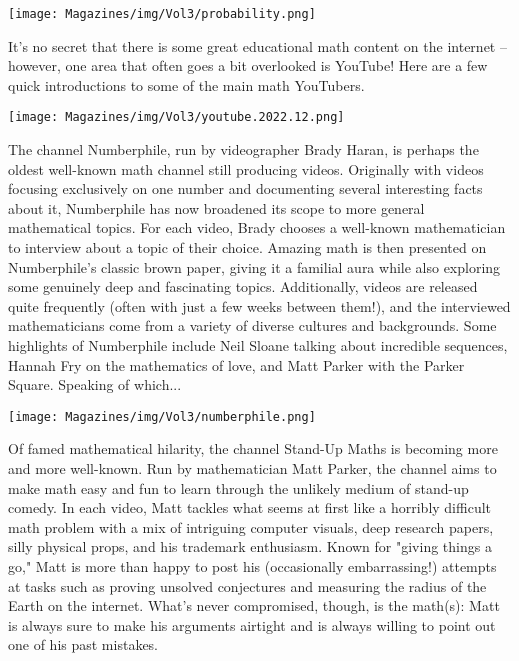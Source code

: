 \documentclass{article}
\begin{document}
\begin{center}
\texttt{[image: Magazines/img/Vol3/probability.png]}
\end{center}
\closearticle
\newpage
\begin{multicols}{3}

It's no secret that there is some great educational math content on the internet -- however, one area that often goes a bit overlooked is YouTube! Here are a few quick introductions to some of the main math YouTubers. 
\begin{center}
\texttt{[image: Magazines/img/Vol3/youtube.2022.12.png]}
\end{center}
The channel Numberphile, run by videographer Brady Haran, is perhaps the oldest well-known math channel still producing videos. Originally with videos focusing exclusively on one number and documenting several interesting facts about it, Numberphile has now broadened its scope to more general mathematical topics. For each video, Brady chooses a well-known mathematician to interview about a topic of their choice. Amazing math is then presented on Numberphile's classic brown paper, giving it a familial aura while also exploring some genuinely deep and fascinating topics. Additionally, videos are released quite frequently (often with just a few weeks between them!), and the interviewed mathematicians come from a variety of diverse cultures and backgrounds. Some highlights of Numberphile include Neil Sloane talking about incredible sequences, Hannah Fry on the mathematics of love, and Matt Parker with the Parker Square. Speaking of which... 
\begin{center}
\texttt{[image: Magazines/img/Vol3/numberphile.png]}
\end{center}
Of famed mathematical hilarity, the channel Stand-Up Maths is becoming more and more well-known. Run by mathematician Matt Parker, the channel aims to make math easy and fun to learn through the unlikely medium of stand-up comedy. In each video, Matt tackles what seems at first like a horribly difficult math problem with a mix of intriguing computer visuals, deep research papers, silly physical props, and his trademark enthusiasm. Known for "giving things a go," Matt is more than happy to post his (occasionally embarrassing!) attempts at tasks such as proving unsolved conjectures and measuring the radius of the Earth on the internet. What's never compromised, though, is the math(s): Matt is always sure to make his arguments airtight and is always willing to point out one of his past mistakes. 


\end{multicols}
\end{document}
